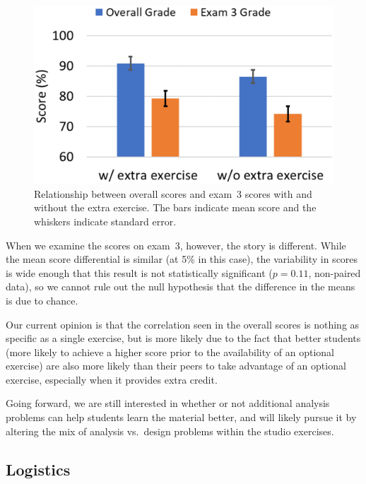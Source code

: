 \begin{figure}[ht]
\centering
\includegraphics[width=\columnwidth]{scores}
\caption{Relationship between overall scores and exam~3 scores
with and without the extra exercise. The bars indicate mean score and
the whiskers indicate standard error.}
\label{fig:scores}
\end{figure}

When we examine the scores on exam~3, however, the story is different. While the mean score differential is similar (at 5\% in this case), the variability in scores is wide enough that this result is not statistically significant ($p = 0.11$, non-paired data), so we cannot rule out the null hypothesis that the difference in the means is due to chance.

Our current opinion is that the correlation seen in the overall scores is nothing as specific as a single exercise, but is more likely due to the fact that better students (more likely to achieve a higher score prior to the availability of an optional exercise) are also more likely than their peers to take advantage of an optional exercise, especially when it provides extra credit.


Going forward, we are still interested in whether or not additional analysis problems can help students learn the material better, and will likely pursue it by altering the mix of analysis vs.~design problems within the studio exercises.

\subsection{Logistics}

